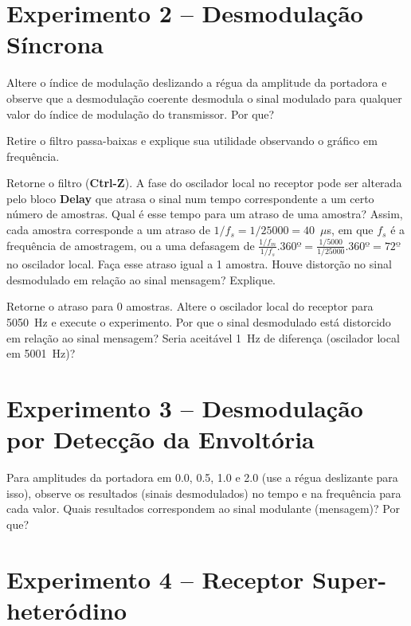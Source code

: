 \documentclass[12pt,addpoints]{exam}
\begin{document}
\section*{Experimento 2 -- Desmodulação Síncrona}

\begin{questions}
    \question Altere o índice de modulação deslizando a régua da amplitude da portadora e observe que a desmodulação coerente desmodula o sinal modulado para qualquer valor do índice de modulação do transmissor. Por que?
    \fillwithlines{0.5in}

    \question Retire o filtro passa-baixas e explique sua utilidade observando o gráfico em frequência.
    \fillwithlines{0.5in}
    
    \question Retorne o filtro ({\bf Ctrl-Z}). A fase do oscilador local no receptor pode ser alterada pelo bloco \textbf{Delay} que atrasa o sinal num tempo correspondente a um certo número de amostras. Qual é esse tempo para um atraso de uma amostra? Assim, cada amostra corresponde a um atraso de $1/f_{s} = 1/25000 =  40$~$\mu$s, em que $f_{s}$ é a frequência de amostragem, ou a uma defasagem de $\frac{1/f_{m}}{1/f_{s}}.360º = \frac{1/5000}{1/25000}.360º = 72º$ no oscilador local. Faça esse atraso igual a 1 amostra. Houve distorção no sinal desmodulado em relação ao sinal mensagem? Explique.
    \fillwithlines{0.75in}
    
    \question Retorne o atraso para 0 amostras. Altere o oscilador local do receptor para 5050~Hz e execute o experimento. Por que o sinal desmodulado está distorcido em relação ao sinal mensagem? Seria aceitável 1~Hz de diferença (oscilador local em 5001~Hz)?
    \fillwithlines{0.75in}
\end{questions}

\section*{Experimento 3 -- Desmodulação por Detecção da Envoltória}

\begin{questions}
    \question Para amplitudes da portadora em 0.0, 0.5, 1.0 e 2.0 (use  a régua deslizante para isso), observe os resultados (sinais desmodulados) no tempo e na frequência para cada valor. Quais resultados correspondem ao sinal modulante (mensagem)? Por que?
    \fillwithlines{0.75in}
\end{questions}

\section*{Experimento 4 -- Receptor Super-heteródino}
\end{document}
